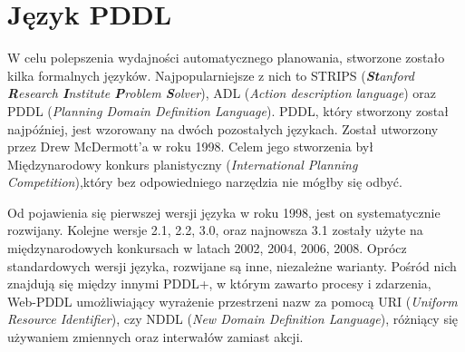 \section{Język PDDL}
W celu polepszenia wydajności automatycznego planowania, stworzone zostało kilka formalnych języków. Najpopularniejsze z nich to STRIPS (\textit{\textbf{St}anford \textbf{R}esearch \textbf{I}nstitute \textbf{P}roblem \textbf{S}olver}), ADL (\textit{Action description language}) oraz PDDL (\textit{Planning Domain Definition Language}). PDDL, który stworzony został najpóźniej, jest wzorowany na dwóch pozostałych językach. Został utworzony przez Drew McDermott'a w roku 1998. Celem jego stworzenia był Międzynarodowy konkurs planistyczny (\textit{International Planning Competition}),który bez odpowiedniego narzędzia nie mógłby się odbyć.

Od pojawienia się pierwszej wersji języka w roku 1998, jest on systematycznie rozwijany. Kolejne wersje 2.1, 2.2, 3.0, oraz najnowsza 3.1 zostały użyte na międzynarodowych konkursach w latach 2002, 2004, 2006, 2008. Oprócz standardowych wersji języka, rozwijane są inne, niezależne warianty. Pośród nich znajdują się między innymi PDDL+, w którym zawarto procesy i zdarzenia, Web-PDDL umożliwiający wyrażenie przestrzeni nazw za pomocą URI (\textit{Uniform Resource Identifier}), czy NDDL (\textit{New Domain Definition Language}), różniący się używaniem zmiennych oraz interwałów zamiast akcji.

